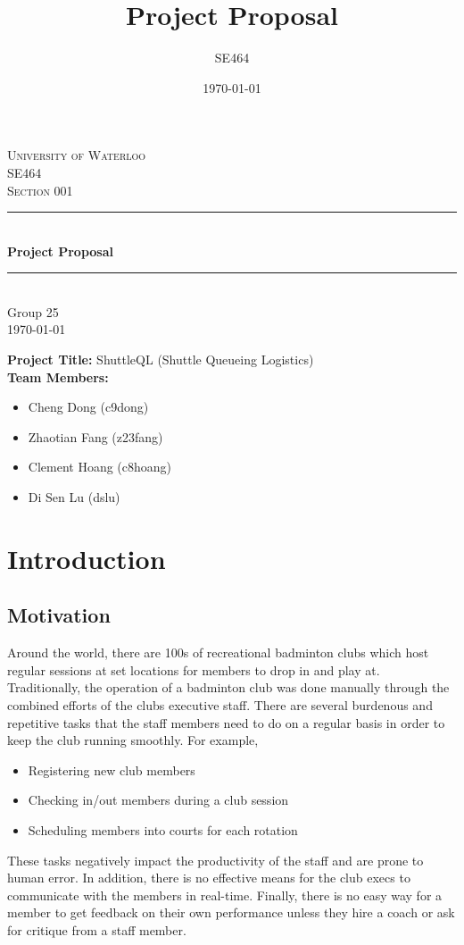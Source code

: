 \documentclass{article}
\title{Project Proposal}
\author{SE464}
\date{\today}
\begin{document}
\begin{titlepage}
\newcommand{\HRule}{\rule{\linewidth}{0.5mm}}

\center

\textsc{\huge University of Waterloo}\\[3cm]
\textsc{\LARGE SE464}\\[1.5cm]
\textsc{\Large Section 001}\\[1.5cm]

\HRule \\[0.75cm]
{ \Huge \bfseries Project Proposal}\\[0.5cm]
\HRule \\[2cm]

\Large Group 25 \\  [8cm]

{\Large \today}\\

\vfill
\end{titlepage}

\noindent\textbf{Project Title:} ShuttleQL (Shuttle Queueing Logistics) \\
\textbf{Team Members:}
\begin{itemize}
  \item Cheng Dong (c9dong)
  \item Zhaotian Fang (z23fang)
  \item Clement Hoang (c8hoang)
  \item Di Sen Lu (dslu)
\end{itemize}

\section{Introduction}
\subsection{Motivation}
Around the world, there are 100s of recreational badminton clubs which host
regular sessions at set locations for members to drop in and play at.
Traditionally, the operation of a badminton club was done manually through the
combined efforts of the clubs executive staff. There are several burdenous
and repetitive tasks that the staff members need to do on a regular basis in
order to keep the club running smoothly. For example,
\begin{itemize}
  \item Registering new club members
  \item Checking in/out members during a club session
  \item Scheduling members into courts for each rotation
\end{itemize}
These tasks negatively impact the productivity of the staff and are prone
to human error.
In addition, there is no effective means for the club execs to communicate
with the members in real-time.
Finally, there is no easy way for a member to get feedback on their own performance
unless they hire a coach or ask for critique from a staff member.
\end{document}
